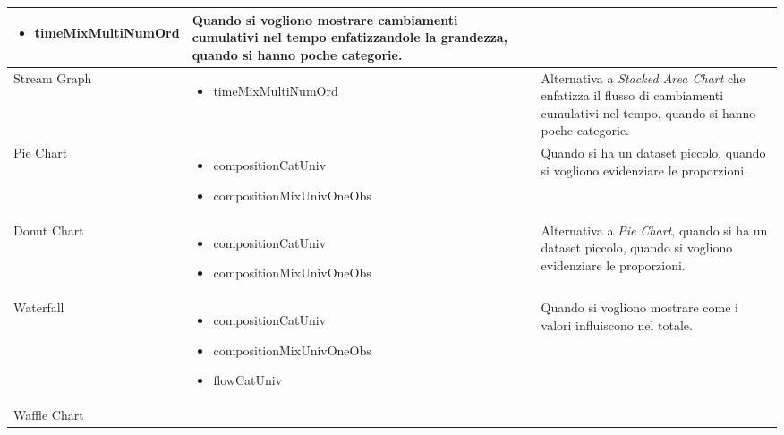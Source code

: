 \begin{xltabular}{\columnwidth}{|p{0.15\columnwidth}|X|p{0.27\columnwidth}|}
\begin{itemize}[noitemsep,topsep=0pt, left=0pt]
        \item timeMixMultiNumOrd
    \end{itemize} & 
    Quando si vogliono mostrare cambiamenti cumulativi nel tempo enfatizzandole la grandezza, quando si hanno poche categorie. \\
    \hline
    Stream Graph & 
    \vspace{-3.5mm}
    \begin{itemize}[noitemsep,topsep=0pt, left=0pt]
        \item timeMixMultiNumOrd
    \end{itemize} & 
    Alternativa a \emph{Stacked Area Chart} che enfatizza il flusso di cambiamenti cumulativi nel tempo, quando si hanno poche categorie. \\
    \hline
    Pie Chart & 
    \vspace{-3.5mm}
    \begin{itemize}[noitemsep,topsep=0pt, left=0pt]
        \item compositionCatUniv
        \item compositionMixUnivOneObs
    \end{itemize} & 
    Quando si ha un dataset piccolo, quando si vogliono evidenziare le proporzioni. \\
    \hline
    Donut Chart & 
    \vspace{-3.5mm}
    \begin{itemize}[noitemsep,topsep=0pt, left=0pt]
        \item compositionCatUniv
        \item compositionMixUnivOneObs
    \end{itemize} & 
    Alternativa a \emph{Pie Chart}, quando si ha un dataset piccolo, quando si vogliono evidenziare le proporzioni. \\
    \hline
    Waterfall & 
    \vspace{-3.5mm}
    \begin{itemize}[noitemsep,topsep=0pt, left=0pt]
        \item compositionCatUniv
        \item compositionMixUnivOneObs
        \item flowCatUniv
    \end{itemize} & 
    Quando si vogliono mostrare come i valori influiscono nel totale. \\
    \hline
    Waffle Chart & 
    \vspace{-3.5mm}
    \begin{itemize}[noitemsep,topsep=0pt, left=0pt]

\end{itemize}
\end{xltabular}
